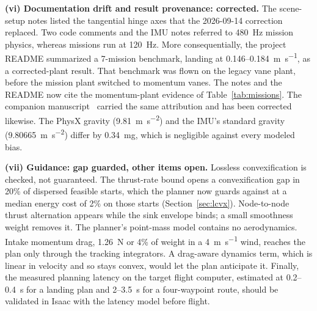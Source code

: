 \documentclass[journal]{IEEEtran}
\newcommand{\refsec}[1]{Section~\ref{#1}}
\newcommand{\reftab}[1]{Table~\ref{#1}}
\begin{document}
\textbf{(vi) Documentation drift and result provenance: corrected.}
The scene-setup notes listed the tangential hinge axes that the 2026-09-14 correction replaced.
Two code comments and the IMU notes referred to \SI{480}{\hertz} mission physics, whereas missions run at \SI{120}{\hertz}.
More consequentially, the project README summarized a 7-mission benchmark, landing at 0.146--\SI{0.184}{\metre\per\second}, as a corrected-plant result.
That benchmark was flown on the legacy vane plant, before the mission plant switched to momentum vanes.
The notes and the README now cite the momentum-plant evidence of \reftab{tab:missions}.
The companion manuscript~\cite{tang2026rl} carried the same attribution and has been corrected likewise.
The PhysX gravity (\SI{9.81}{\metre\per\second\squared}) and the IMU's standard gravity (\SI{9.80665}{\metre\per\second\squared}) differ by \SI{0.34}{\milli g}, which is negligible against every modeled bias.

\textbf{(vii) Guidance: gap guarded, other items open.}
Lossless convexification is checked, not guaranteed.
The thrust-rate bound opens a convexification gap in 20\% of dispersed feasible starts, which the planner now guards against at a median energy cost of 2\% on those starts (\refsec{sec:lcvx}).
Node-to-node thrust alternation appears while the sink envelope binds; a small smoothness weight removes it.
The planner's point-mass model contains no aerodynamics.
Intake momentum drag, \SI{1.26}{\newton} or 4\% of weight in a \SI{4}{\metre\per\second} wind, reaches the plan only through the tracking integrators.
A drag-aware dynamics term, which is linear in velocity and so stays convex, would let the plan anticipate it.
Finally, the measured planning latency on the target flight computer, estimated at 0.2--\SI{0.4}{\second} for a landing plan and 2--\SI{3.5}{\second} for a four-waypoint route, should be validated in Isaac with the latency model before flight.
\end{document}
